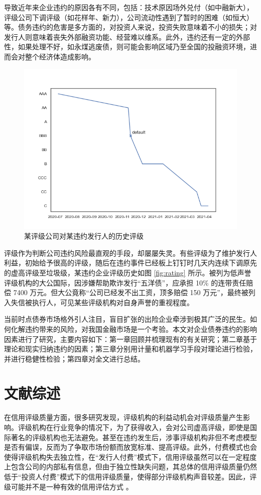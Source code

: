 导致近年来企业违约的原因各有不同，包括：技术原因场外兑付（如中融新大），评级公司下调评级（如花样年、新力），公司流动性遇到了暂时的困难（如恒大）等。债务违约的危害是多方面的，对投资人来说，投资失败意味着不小的损失；对发行人则意味着丧失外部融资功能、经营难以维系。此外，违约还有一定的外部性，如果处理不好，如永煤逃废债，则可能会影响区域乃至全国的投融资环境，进而会对整个经济体造成影响。

\begin{figure}[h]
	\centering
	\includegraphics[width=0.9\linewidth]{./data/rating_of_zg.png}
	\caption{某评级公司对某违约发行人的历史评级}
	\label{fig:rating_of_zg}
\end{figure}
评级作为判断公司违约风险最直观的手段，却屡屡失灵。有些评级为了维护发行人利益，初始给予很高的评级，随后在违约事件已经板上钉钉时几天内连续下调原先的虚高评级至垃圾级，某违约企业评级历史如图 \ref{fig:rating} 所示。被\Textcite{王雄元2013声誉机制}列为低声誉评级机构的大公国际，因涉嫌帮助欺诈发行“五洋债”，应承担 10\% 的连带责任赔偿 7400 万元。但大公竟称“公司已经发不出工资，顶多赔偿 150 万元”，最终被列入失信被执行人，可见某些评级机构对自身声誉的重视程度。

当前时点债券市场格外引人注目，盲目扩张的出险企业牵涉到极其广泛的民生。如何化解违约带来的风险，对我国金融市场是一个考验。本文对企业债券违约的影响因素进行了研究，主要内容如下：第一章回顾并梳理现有的有关研究；第二章基于理论和现实归纳违约的因素；第三章分别用计量和机器学习手段对理论进行检验，并进行稳健性检验；第四章对全文进行总结。

\section{文献综述}
\label{sec:zs}
在信用评级质量方面，很多研究发现，评级机构的利益动机会对评级质量产生影响。评级机构在行业竞争的情况下，为了获得收入，会对公司虚高评级，即使是国际著名的评级机构也无法避免\cite{opp2013rating}。甚至在违约发生后，涉事评级机构非但不考虑模型是否有偏误，反而为了争取市场份额而放宽标准、提高评级\cite{黄小琳2017债券违约对涉事信用评级机构的影响}。此外，付费模式也会使得评级机构失去独立性，在“发行人付费”模式下，信用评级虽然可以在一定程度上包含公司的内部私有信息，但由于独立性缺失问题，其总体的信用评级质量仍然低于“投资人付费”模式下的信用评级质量，使得部分评级机构声音较差\cite{吴育辉2020,陈关亭2021多重信用评级与债券融资成本}。因此，评级可能并不是一种有效的信用评估方式 \cite{blochlinger2018ratings}。

